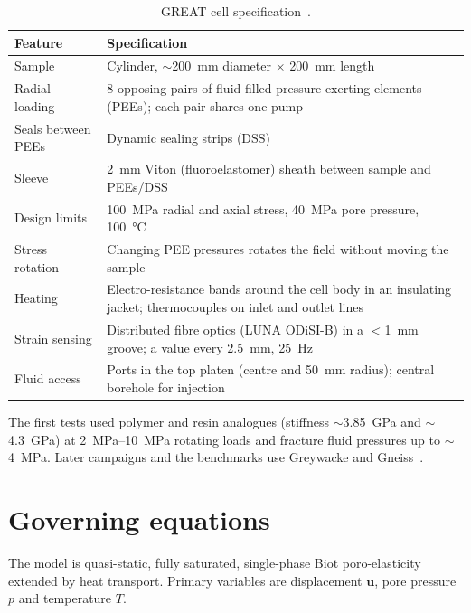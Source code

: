 \documentclass[11pt,a4paper]{article}
\begin{document}
\begin{table}[htbp]
\centering
\caption{GREAT cell specification~\cite{McDermott2018}.}
\label{tab:apparatus}
\begin{tabularx}{\textwidth}{@{}lL@{}}
\toprule
Feature & Specification \\
\midrule
Sample           & Cylinder, $\sim$\SI{200}{mm} diameter $\times$ \SI{200}{mm} length \\
Radial loading   & 8 opposing pairs of fluid-filled pressure-exerting elements (PEEs); each pair shares one pump \\
Seals between PEEs & Dynamic sealing strips (DSS) \\
Sleeve           & \SI{2}{mm} Viton (fluoroelastomer) sheath between sample and PEEs/DSS \\
Design limits    & \SI{100}{MPa} radial and axial stress, \SI{40}{MPa} pore pressure, \SI{100}{\celsius} \\
Stress rotation  & Changing PEE pressures rotates the field without moving the sample \\
Heating          & Electro-resistance bands around the cell body in an insulating jacket; thermocouples on inlet and outlet lines \\
Strain sensing   & Distributed fibre optics (LUNA ODiSI-B) in a $<$\SI{1}{mm} groove; a value every \SI{2.5}{mm}, \SI{25}{Hz} \\
Fluid access     & Ports in the top platen (centre and \SI{50}{mm} radius); central borehole for injection \\
\bottomrule
\end{tabularx}
\end{table}

The first tests used polymer and resin analogues (stiffness $\sim$\SI{3.85}{GPa}
and $\sim$\SI{4.3}{GPa}) at \SIrange{2}{10}{MPa} rotating loads and fracture
fluid pressures up to $\sim$\SI{4}{MPa}. Later campaigns and the benchmarks use
Greywacke and Gneiss~\cite{Mollaali2026}.

\section{Governing equations}
The model is quasi-static, fully saturated, single-phase Biot poro-elasticity
extended by heat transport. Primary variables are displacement $\mathbf{u}$,
pore pressure $p$ and temperature $T$.
\end{document}
